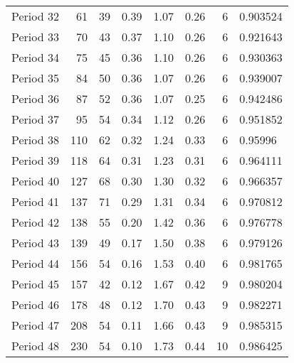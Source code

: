 \begin{tabular}{lrrrrrrl}
Period 32 &                      61 &          39 &        0.39 &        1.07 &        0.26 &           6 &   0.903524 \\
Period 33 &                      70 &          43 &        0.37 &        1.10 &        0.26 &           6 &   0.921643 \\
Period 34 &                      75 &          45 &        0.36 &        1.10 &        0.26 &           6 &   0.930363 \\
Period 35 &                      84 &          50 &        0.36 &        1.07 &        0.26 &           6 &   0.939007 \\
Period 36 &                      87 &          52 &        0.36 &        1.07 &        0.25 &           6 &   0.942486 \\
Period 37 &                      95 &          54 &        0.34 &        1.12 &        0.26 &           6 &   0.951852 \\
Period 38 &                     110 &          62 &        0.32 &        1.24 &        0.33 &           6 &    0.95996 \\
Period 39 &                     118 &          64 &        0.31 &        1.23 &        0.31 &           6 &   0.964111 \\
Period 40 &                     127 &          68 &        0.30 &        1.30 &        0.32 &           6 &   0.966357 \\
Period 41 &                     137 &          71 &        0.29 &        1.31 &        0.34 &           6 &   0.970812 \\
Period 42 &                     138 &          55 &        0.20 &        1.42 &        0.36 &           6 &   0.976778 \\
Period 43 &                     139 &          49 &        0.17 &        1.50 &        0.38 &           6 &   0.979126 \\
Period 44 &                     156 &          54 &        0.16 &        1.53 &        0.40 &           6 &   0.981765 \\
Period 45 &                     157 &          42 &        0.12 &        1.67 &        0.42 &           9 &   0.980204 \\
Period 46 &                     178 &          48 &        0.12 &        1.70 &        0.43 &           9 &   0.982271 \\
Period 47 &                     208 &          54 &        0.11 &        1.66 &        0.43 &           9 &   0.985315 \\
Period 48 &                     230 &          54 &        0.10 &        1.73 &        0.44 &          10 &   0.986425 \\

\end{tabular}
